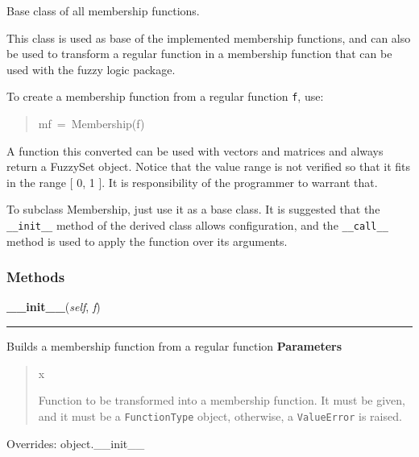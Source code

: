 Base class of all membership functions.

This class is used as base of the implemented membership functions, and can
also be used to transform a regular function in a membership function that
can be used with the fuzzy logic package.

To create a membership function from a regular function \texttt{f}, use:
%
\begin{quote}{\ttfamily \raggedright \noindent
mf~=~Membership(f)
}
\end{quote}

A function this converted can be used with vectors and matrices and always
return a FuzzySet object. Notice that the value range is not verified so
that it fits in the range {[} 0, 1 {]}. It is responsibility of the programmer
to warrant that.

To subclass Membership, just use it as a base class. It is suggested that
the \texttt{\_\_init\_\_} method of the derived class allows configuration, and the
\texttt{\_\_call\_\_} method is used to apply the function over its arguments.


  \subsubsection{Methods}

    \vspace{0.5ex}

\hspace{.8\funcindent}\begin{boxedminipage}{\funcwidth}

    \raggedright \textbf{\_\_init\_\_}(\textit{self}, \textit{f})

    \vspace{-1.5ex}

    \rule{\textwidth}{0.5\fboxrule}
\setlength{\parskip}{2ex}

Builds a membership function from a regular function
\setlength{\parskip}{1ex}
      \textbf{Parameters}
      \vspace{-1ex}

      \begin{quote}
        \begin{Ventry}{x}

          \item[f]


Function to be transformed into a membership function. It must be
given, and it must be a \texttt{FunctionType} object, otherwise, a
\texttt{ValueError} is raised.
        \end{Ventry}

      \end{quote}

      Overrides: object.\_\_init\_\_

    \end{boxedminipage}

